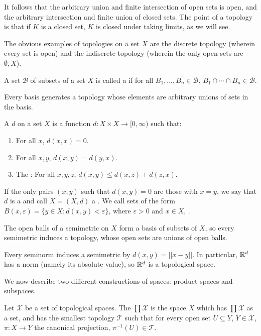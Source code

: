 It follows that the arbitrary union and finite intersection of open sets is open, and the arbitrary intersection and finite union of closed sets.
The point of a topology is that if $K$ is a closed set, $K$ is closed under taking limits, as we will see.

The obvious examples of topologies on a set $X$ are the discrete topology (wherein every set is open) and the indiscrete topology (wherein the only open sets are $\emptyset, X$).

\begin{definition}
A set $\mathcal B$ of subsets of a set $X$ is called a  if for all $B_1, \dots, B_n \in \mathcal B$, $B_1 \cap \cdots \cap B_n \in \mathcal B$.
\end{definition}

Every basis generates a topology whose elements are arbitrary unions of sets in the basis.

\begin{definition}
A  $d$ on a set $X$ is a function $d: X \times X \to [0, \infty)$ such that:
\begin{enumerate}
\item For all $x$, $d(x, x) = 0$.
\item For all $x,y$, $d(x, y) = d(y, x)$.
\item The : For all $x,y,z$, $d(x, y) \leq d(x, z) + d(z, x)$.
\end{enumerate}
If the only pairs $(x, y)$ such that $d(x, y) = 0$ are those with $x=y$, we say that $d$ is a  and call $X = (X,d)$ a .
We call sets of the form $B(x, \varepsilon) = \{y \in X: d(x, y) < \varepsilon\}$, where $\varepsilon > 0$ and $x \in X$, .
\end{definition}

The open balls of a semimetric on $X$ form a basis of subsets of $X$, so every semimetric induces a topology, whose open sets are unions of open balls.

\begin{example}
Every seminorm induces a semimetric by $d(x, y) = ||x - y||$.
In particular, $\mathbb{R}^d$ has a norm (namely its absolute value), so $\mathbb{R}^d$ is a topological space.
\end{example}

We now describe two different constructions of spaces: product spaces and subspaces.

\begin{definition}
Let $\mathcal X$ be a set of topological spaces. The  $\prod \mathcal X$ is the space $X$ which has $\prod \mathcal X$ as a set, and has the smallest topology $\mathcal T$ such that for every open set $U \subseteq Y$, $Y \in \mathcal X$, $\pi: X \to Y$ the canonical projection, $\pi^{-1}(U) \in \mathcal T$.
\end{definition}

